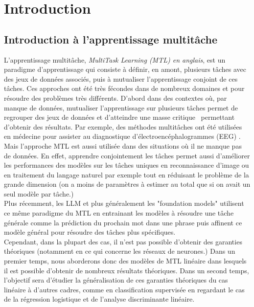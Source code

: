 \documentclass[12pt]{article}
\begin{document}
\newpage
\thispagestyle{empty}
\tableofcontents
\newpage

\section{Introduction}
\subsection{Introduction à l'apprentissage multitâche}

L'apprentissage multitâche, \textit{MultiTask Learning (MTL) en anglais}, est un paradigme d'apprentissage qui consiste à définir, en amont, plusieurs tâches avec des jeux de données associés, puis à mutualiser l'apprentissage conjoint de ces tâches. Ces approches ont été très fécondes dans de nombreux domaines et pour résoudre des problèmes très différents. D'abord dans des contextes où, par manque de données, mutualiser l'apprentissage sur plusieurs tâches permet de regrouper des jeux de données et d'atteindre une \og masse critique \fg \, permettant d'obtenir des résultats. Par exemple, des méthodes multitâches ont été utilisées en médecine pour assister au diagnostique d'électroencéphalogrammes (EEG) \cite{EEG_LDA}. 
Mais l'approche MTL est aussi utilisée dans des situations où il ne manque pas de données. En effet, apprendre conjointement les tâches permet aussi d'améliorer les performances des modèles sur les tâches uniques en reconnaissance d'image ou en traitement du langage naturel par exemple \cite{MTL_natural_process} tout en réduisant le problème de la grande dimension (on a moins de paramètres à estimer au total que si on avait un seul modèle par tâche.)\\
Plus récemment, les LLM et plus généralement les "foundation models" utilisent ce même paradigme du MTL en entrainant les modèles à résoudre une tâche générale comme la prédiction du prochain mot dans une phrase puis affinent ce modèle général pour résoudre des tâches plus spécifiques. \\

Cependant, dans la plupart des cas, il n'est pas possible d'obtenir des garanties théoriques (notamment en ce qui concerne les réseaux de neurones.) Dans un premier temps, nous aborderons donc des modèles de MTL linéaire dans lesquels il est possible d'obtenir de nombreux résultats théoriques. Dans un second temps, l'objectif sera d'étudier la généralisation de ces garanties théoriques du cas linéaire à d'autres cadres, comme en classification supervisée en regardant le cas de la régression logistique et de l'analyse discriminante linéaire.\\
\end{document}
